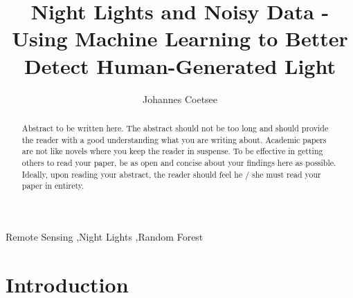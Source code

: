 \documentclass[11pt,preprint, authoryear]{elsarticle}
\numberwithin{equation}{section}
\numberwithin{figure}{section}
\numberwithin{table}{section}
\begin{document}
\begin{frontmatter}  %

\title{Night Lights and Noisy Data - Using Machine Learning to Better
Detect Human-Generated Light}





\author[Add1]{Johannes Coetsee}





\address[Add1]{Stellenbosch University}


\begin{abstract}
\small{
Abstract to be written here. The abstract should not be too long and
should provide the reader with a good understanding what you are writing
about. Academic papers are not like novels where you keep the reader in
suspense. To be effective in getting others to read your paper, be as
open and concise about your findings here as possible. Ideally, upon
reading your abstract, the reader should feel he / she must read your
paper in entirety.
}
\end{abstract}

\vspace{1cm}

\begin{keyword}
\footnotesize{
Remote Sensing \sep Night Lights \sep Random Forest \\ \vspace{0.3cm}
}
\end{keyword}
\vspace{0.5cm}
\end{frontmatter}



\pagestyle{fancy}
\chead{}
\lfoot{}
\lhead{}
\cfoot{}


\headsep 35pt %




\hypertarget{introduction}{%
\section{\texorpdfstring{Introduction
\label{Introduction}}{Introduction }}\label{introduction}}
\end{document}
